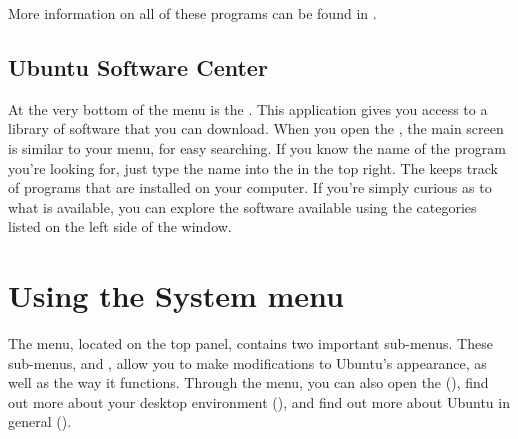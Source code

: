 More information on all of these programs can be found in .


\subsection{Ubuntu Software Center}

At the very bottom of the  menu is the . This application gives you
access to a library of software that you can download. When you open the , the main screen is similar to your  menu, for easy searching. If you know the name of the program you're looking for, just type the name into the  in the top right. The  keeps track of programs that are installed on your computer. If you're simply curious as to what is available, you can explore the software available using the categories listed on the left side of the window.


\section{Using the System menu}
The  menu, located on the top panel, contains two important sub-menus. These sub-menus,
 and , allow you to make modifications to Ubuntu's appearance, as well as the way it functions. Through the  menu, you can also open the  (), find out more about your  desktop environment (), and find out more about Ubuntu in general ().

